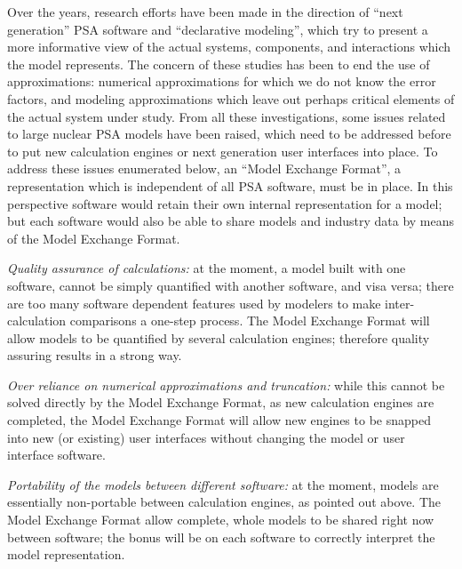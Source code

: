 \documentclass[11pt]{article}
\begin{document}
Over the years, research efforts have been made in the direction of
``next generation'' PSA software and ``declarative modeling'', which try to
present a more informative view of the actual systems, components, and
interactions which the model represents. The concern of these studies
has been to end the use of approximations: numerical approximations for
which we do not know the error factors, and modeling approximations
which leave out perhaps critical elements of the actual system under
study. From all these investigations, some issues related to large
nuclear PSA models have been raised, which need to be addressed before
to put new calculation engines or next generation user interfaces into
place. To address these issues enumerated below, an ``Model Exchange
Format'', a representation which is independent of all PSA software, must
be in place. In this perspective software would retain their own
internal representation for a model; but each software would also be
able to share models and industry data by means of the Model Exchange
Format.

\emph{Quality assurance of calculations:} at the moment, a model built with
one software, cannot be simply quantified with another software, and
visa versa; there are too many software dependent features used by
modelers to make inter-calculation comparisons a one-step process. The
Model Exchange Format will allow models to be quantified by several
calculation engines; therefore quality assuring results in a strong way.

\emph{Over reliance on numerical approximations and truncation:} while this
cannot be solved directly by the Model Exchange Format, as new
calculation engines are completed, the Model Exchange Format will allow
new engines to be snapped into new (or existing) user interfaces without
changing the model or user interface software.

\emph{Portability of the models between different software:} at the moment,
models are essentially non-portable between calculation engines, as
pointed out above. The Model Exchange Format allow complete, whole
models to be shared right now between software; the bonus will be on
each software to correctly interpret the model representation.
\end{document}
